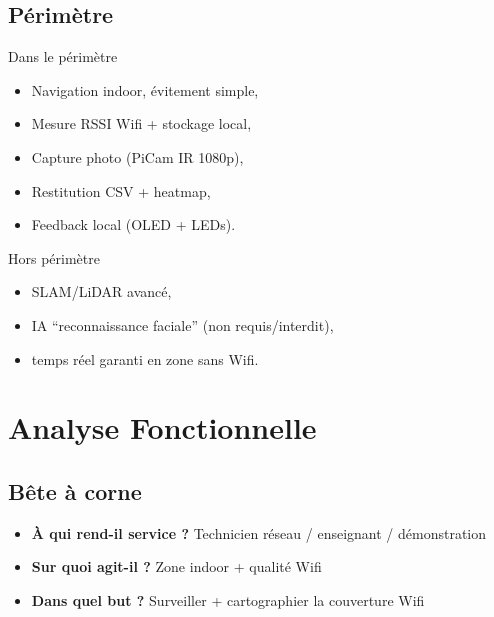 \documentclass[a4paper,12pt]{report}
\begin{document}
\section{Périmètre}
\begin{infobox}{Dans le périmètre}
\begin{itemize}
    \item Navigation indoor, évitement simple,
    \item Mesure RSSI Wifi + stockage local,
    \item Capture photo (PiCam IR 1080p),
    \item Restitution CSV + heatmap,
    \item Feedback local (OLED + LEDs).
\end{itemize}
\end{infobox}

\begin{infobox}{Hors périmètre}
\begin{itemize}
    \item SLAM/LiDAR avancé,
    \item IA “reconnaissance faciale” (non requis/interdit),
    \item temps réel garanti en zone sans Wifi.
\end{itemize}
\end{infobox}

\chapter{Analyse Fonctionnelle}

\section{Bête à corne}
\begin{itemize}
    \item \textbf{À qui rend-il service ?} Technicien réseau / enseignant / démonstration
    \item \textbf{Sur quoi agit-il ?} Zone indoor + qualité Wifi
    \item \textbf{Dans quel but ?} Surveiller + cartographier la couverture Wifi
\end{itemize}
\end{document}
